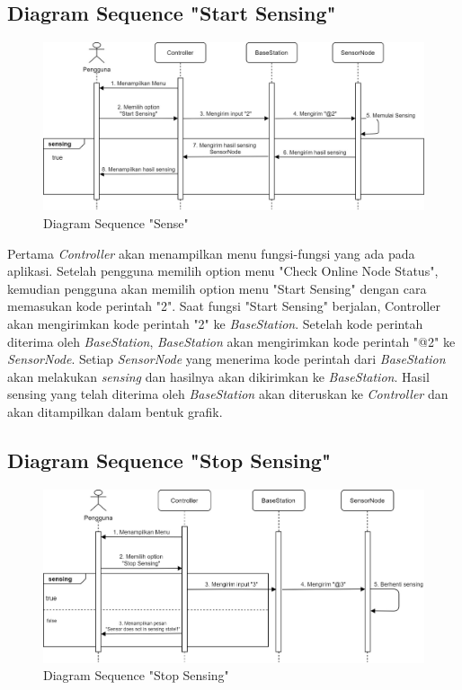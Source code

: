 \subsection{Diagram Sequence "Start Sensing"}
\begin{figure}[H] 
	\centering  
	\includegraphics[scale=0.35]{Gambar/Sense.jpg}  
	\caption[Diagram Sequence "Sense"]{Diagram Sequence "Sense"}
	\label{fig:sense} 
\end{figure}

Pertama \textit{Controller} akan menampilkan menu fungsi-fungsi yang ada pada aplikasi. Setelah pengguna memilih option menu "Check Online Node Status", kemudian pengguna akan memilih option menu "Start Sensing" dengan cara memasukan kode perintah "2". Saat fungsi "Start Sensing" berjalan, Controller akan mengirimkan kode perintah "2" ke \textit{BaseStation}. Setelah kode perintah diterima oleh \textit{BaseStation}, \textit{BaseStation} akan mengirimkan kode perintah "@2" ke \textit{SensorNode}. Setiap \textit{SensorNode} yang menerima kode perintah dari \textit{BaseStation} akan melakukan \textit{sensing} dan hasilnya akan dikirimkan ke \textit{BaseStation}. Hasil sensing yang telah diterima oleh \textit{BaseStation} akan diteruskan ke \textit{Controller} dan akan ditampilkan dalam bentuk grafik.

\subsection{Diagram Sequence "Stop Sensing"}
\begin{figure}[H] 
	\centering  
	\includegraphics[scale=0.35]{Gambar/stop.jpg}  
	\caption[Diagram Sequence "Stop Sensing"]{Diagram Sequence "Stop Sensing"}
	\label{fig:stop} 
\end{figure}

